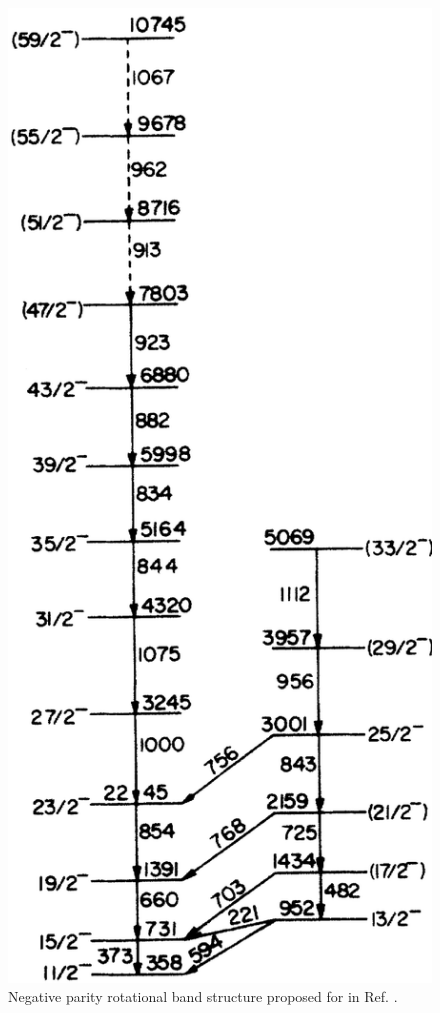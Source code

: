 \begin{figure}[t!]
\centerline{\includegraphics[height=0.4\textheight]{./img/c4/old_scheme_bands.png}}
	\caption{Negative parity rotational band structure proposed for \pr{} in Ref. \cite{semkow135Pr}.\label{fig:chp4-semkow-prev-bands}}
\end{figure}
